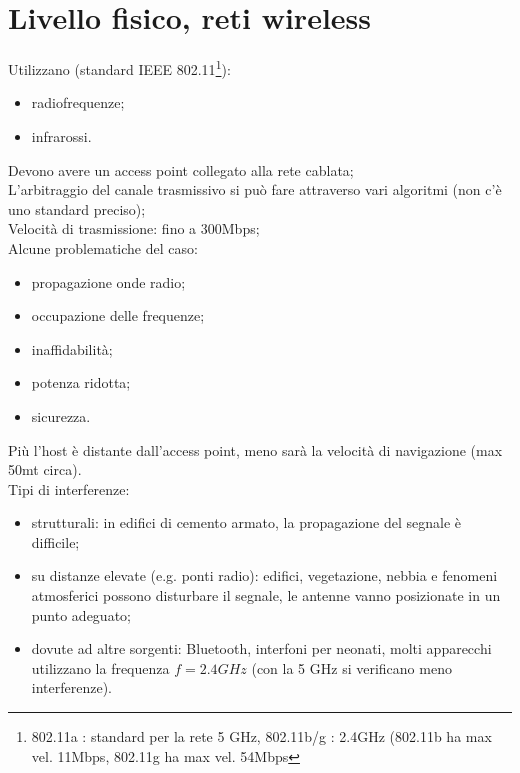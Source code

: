 \section*{Livello fisico, reti wireless}
\noindent Utilizzano (standard IEEE 802.11\footnote{802.11a : standard per la rete 5 GHz, 802.11b/g : 2.4GHz (802.11b ha max vel. 11Mbps, 802.11g ha max vel. 54Mbps}): \begin{itemize}
    \item radiofrequenze;
    \item infrarossi.
\end{itemize}
\noindent Devono avere un access point collegato alla rete cablata;\\
\noindent L'arbitraggio del canale trasmissivo si può fare attraverso vari algoritmi (non c'è uno standard preciso);\\
\noindent Velocità di trasmissione: fino a 300Mbps;\\
\noindent Alcune problematiche del caso:\begin{itemize}
    \item propagazione onde radio;
    \item occupazione delle frequenze;
    \item inaffidabilità;
    \item potenza ridotta;
    \item sicurezza.
\end{itemize}
\noindent Più l'host è distante dall'access point, meno sarà la velocità di navigazione (max 50mt circa).\\

\noindent Tipi di interferenze:
\begin{itemize}
    \item strutturali: in edifici di cemento armato, la propagazione del segnale è difficile;
    \item su distanze elevate (e.g. ponti radio): edifici, vegetazione, nebbia e fenomeni atmosferici possono disturbare il segnale, le antenne vanno posizionate in un punto adeguato;
    \item dovute ad altre sorgenti: Bluetooth, interfoni per neonati, molti apparecchi utilizzano la frequenza $f = 2.4 GHz$ (con la 5 GHz si verificano meno interferenze).
\end{itemize}

